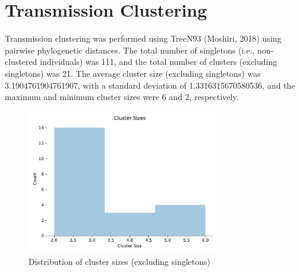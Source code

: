 \documentclass{article}
\begin{document}
\section{Transmission Clustering}
Transmission clustering was performed using TreeN93 (Moshiri, 2018) using pairwise phylogenetic distances.
The total number of singletons (i.e., non-clustered individuals) was 111,
and the total number of clusters (excluding singletons) was 21.
The average cluster size (excluding singletons) was 3.1904761904761907,
with a standard deviation of 1.3316315670580536,
and the maximum and minimum cluster sizes were 6 and 2, respectively.


\begin{figure}[h]
\centering
\includegraphics[width=0.75\textwidth]{./figs/cluster_sizes.pdf}
\caption{Distribution of cluster sizes (excluding singletons)}
\end{figure}
\end{document}
